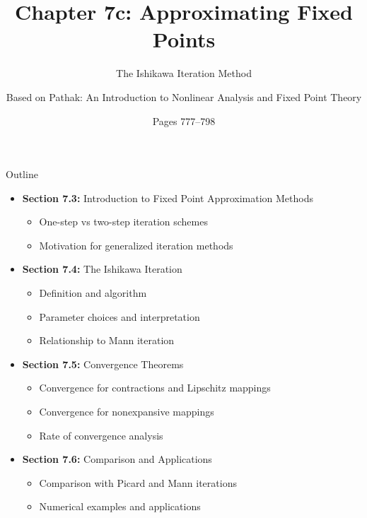 \documentclass[aspectratio=169,10pt]{beamer}
\title{Chapter 7c: Approximating Fixed Points}
\subtitle{The Ishikawa Iteration Method}
\author{Based on Pathak: An Introduction to Nonlinear Analysis and Fixed Point Theory}
\date{Pages 777--798}
\begin{document}
\begin{frame}
\titlepage
\end{frame}

\begin{frame}[allowframebreaks]{Outline}
\begin{itemize}
    \item \textbf{Section 7.3:} Introduction to Fixed Point Approximation Methods
    \begin{itemize}
        \item One-step vs two-step iteration schemes
        \item Motivation for generalized iteration methods
    \end{itemize}
    \vspace{0.3cm}
    \item \textbf{Section 7.4:} The Ishikawa Iteration
    \begin{itemize}
        \item Definition and algorithm
        \item Parameter choices and interpretation
        \item Relationship to Mann iteration
    \end{itemize}
    \vspace{0.3cm}
    \item \textbf{Section 7.5:} Convergence Theorems
    \begin{itemize}
        \item Convergence for contractions and Lipschitz mappings
        \item Convergence for nonexpansive mappings
        \item Rate of convergence analysis
    \end{itemize}
    \vspace{0.3cm}
    \item \textbf{Section 7.6:} Comparison and Applications
    \begin{itemize}
        \item Comparison with Picard and Mann iterations
        \item Numerical examples and applications
    \end{itemize}
\end{itemize}
\end{frame}
\end{document}
